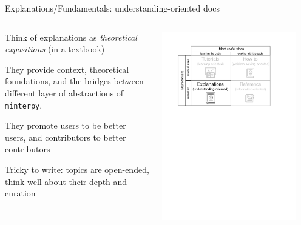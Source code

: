 \documentclass[english,aspectratio=169]{beamer}
\let\tempone\itemize
\let\temptwo\enditemize
\renewenvironment{itemize}{\tempone\addtolength{\itemsep}{0.35\baselineskip}}{\temptwo}
\begin{document}
\begin{frame}{Explanations/Fundamentals: understanding-oriented docs}
\footnotesize

\begin{columns}[onlytextwidth]

\begin{column}{0.5\textwidth}

\begin{itemize}
    \item Think of explanations as \emph{theoretical expositions} (in a textbook)
    \item They provide context, theoretical foundations,
          and the bridges between different layer of abstractions of \texttt{minterpy}.
    \item They promote users to be better users,
          and contributors to better contributors
    \item Tricky to write: topics are open-ended,
          think well about their depth and curation
\end{itemize}

\end{column}

\begin{column}{0.5\textwidth}
    \begin{center}
    \includegraphics[width=0.9\textwidth]{./figures/documentation-system-explanations}
    \end{center}
\end{column}

\end{columns}

\end{frame}
\end{document}
